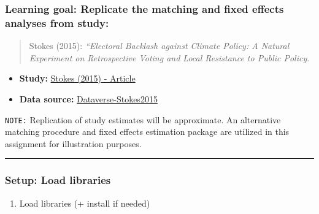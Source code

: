 \documentclass[
  letterpaper,
  DIV=11,
  numbers=noendperiod]{scrartcl}
\providecommand{\tightlist}{%
  \setlength{\itemsep}{0pt}\setlength{\parskip}{0pt}}
\begin{document}
\subsubsection{Learning goal: Replicate the matching and fixed effects
analyses from
study:}\label{learning-goal-replicate-the-matching-and-fixed-effects-analyses-from-study}

\begin{quote}
Stokes (2015): \emph{``Electoral Backlash against Climate Policy: A
Natural Experiment on Retrospective Voting and Local Resistance to
Public Policy}.
\end{quote}

\begin{itemize}
\tightlist
\item
  \textbf{Study:}
  \href{https://drive.google.com/file/d/1y2Okzjq2EA43AW5JzCvFS8ecLpeP6NKh/view?usp=sharing}{Stokes
  (2015) - Article}
\item
  \textbf{Data source:}
  \href{https://dataverse.harvard.edu/dataset.xhtml?persistentId=doi:10.7910/DVN/SDUGCC}{Dataverse-Stokes2015}
\end{itemize}

\begin{tcolorbox}[enhanced jigsaw, colback=white, breakable, rightrule=.15mm, leftrule=.75mm, colframe=quarto-callout-color-frame, opacityback=0, arc=.35mm, bottomrule=.15mm, toprule=.15mm, left=2mm]

\texttt{NOTE:} Replication of study estimates will be approximate. An
alternative matching procedure and fixed effects estimation package are
utilized in this assignment for illustration purposes.

\end{tcolorbox}

\begin{center}\rule{0.5\linewidth}{0.5pt}\end{center}

\subsubsection{Setup: Load libraries}\label{setup-load-libraries}

\begin{enumerate}
\def\labelenumi{\arabic{enumi}.}
\setcounter{enumi}{-1}
\tightlist
\item
  Load libraries (+ install if needed)
\end{enumerate}
\end{document}
